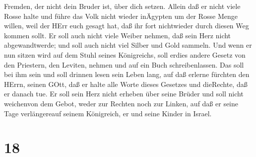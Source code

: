 Fremden, der nicht dein Bruder ist, über dich setzen. 
Allein daß er nicht viele Rosse halte und führe das Volk nicht wieder
inÄgypten um der Rosse Menge willen, weil der HErr euch gesagt hat, daß
ihr fort nichtwieder durch diesen Weg kommen sollt.  Er
soll auch nicht viele Weiber nehmen, daß sein Herz nicht abgewandtwerde;
und soll auch nicht viel Silber und Gold sammeln.  Und wenn
er nun sitzen wird auf dem Stuhl seines Königreichs, soll erdies andere
Gesetz von den Priestern, den Leviten, nehmen und auf ein Buch
schreibenlassen.  Das soll bei ihm sein und soll drinnen
lesen sein Leben lang, auf daß erlerne fürchten den HErrn, seinen GOtt,
daß er halte alle Worte dieses Gesetzes und dieRechte, daß er danach
tue.  Er soll sein Herz nicht erheben über seine Brüder und
soll nicht weichenvon dem Gebot, weder zur Rechten noch zur Linken, auf
daß er seine Tage verlängereauf seinem Königreich, er und seine Kinder
in Israel.

\hypertarget{section-17}{%
\section{18}\label{section-17}}


